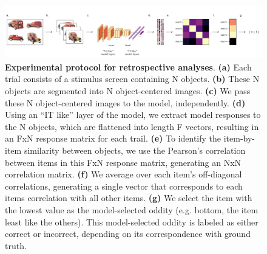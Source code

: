 \documentclass[11pt]{article}
\newcommand{\beginsupplement}{
    \setcounter{figure}{0}
    \renewcommand{\thefigure}{S\arabic{figure}}}
\begin{document}
\beginsupplement

\begin{figure}[ht]
\centering
\includegraphics[width=\linewidth]{figures/retrospective_experimental_protocol}
\renewcommand{\figurename}{Supplementary Figure}
\caption{\textbf{ Experimental protocol for retrospective analyses}. \textbf{(a)} Each trial consists of a stimulus screen containing N objects. \textbf{(b)} These N objects are segmented into N object-centered images. \textbf{(c)} We pass these N object-centered images to the model, independently. \textbf{(d)} Using an “IT like” layer of the model, we extract model responses to the N objects, which are flattened into length F vectors, resulting in an FxN response matrix for each trail. \textbf{(e)} To identify the item-by-item similarity between objects, we use the Pearson’s correlation between items in this FxN response matrix, generating an NxN correlation matrix. \textbf{(f)} We average over each item's off-diagonal correlations, generating a single vector that corresponds to each items correlation with all other items. \textbf{(g)} We select the item with the lowest value as the model-selected oddity (e.g. bottom, the item least like the others). This model-selected oddity is labeled as either correct or incorrect, depending on its correspondence with ground truth.}
\label{fig:retrospective_protocol}
\end{figure}
\end{document}
